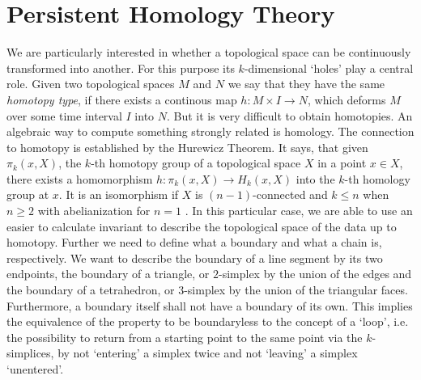 \documentclass[runningheads]{llncs}
\begin{document}
\section{Persistent Homology Theory}
\label{sec:simplicialhomology}
We are particularly interested in whether a topological space can be continuously transformed into another. For this purpose its $k$-dimensional `holes' play a central role. Given two topological spaces $M$ and $N$ we say that they have the same \textit{homotopy type}, if there exists a continous map $h: M \times I \rightarrow N$, which deforms $M$ over some time interval $I$ into $N$. But it is very difficult to obtain homotopies. An algebraic way to compute something strongly related is homology. The connection to homotopy is established by the Hurewicz Theorem. It says, that given $\pi_k(x,X)$, the $k$-th homotopy group of a topological space $X$ in a point $x \in X$, there exists a homomorphism $h: \pi_k(x,X) \rightarrow H_k(x,X)$ into the $k$-th homology group at $x$. It is an isomorphism if $X$ is $(n-1)$-connected and $k \leq n$ when $n \geq 2$ with abelianization for $n = 1$ \cite{hatcher2005algebraic}. In this particular case, we are able to use an easier to calculate invariant to describe the topological space of the data up to homotopy. Further we need to define what a boundary and what a chain is, respectively. We want to describe the boundary of a line segment by its two endpoints, the boundary of a triangle, or $2$-simplex by the union of the edges and the boundary of a tetrahedron, or $3$-simplex by the union of the triangular faces. Furthermore, a boundary itself shall not have a boundary of its own. This implies the equivalence of the property to be boundaryless to the concept of a `loop', i.e. the possibility to return from a starting point to the same point via the $k$-simplices, by not `entering' a simplex twice and not `leaving' a simplex `unentered'.
\end{document}
